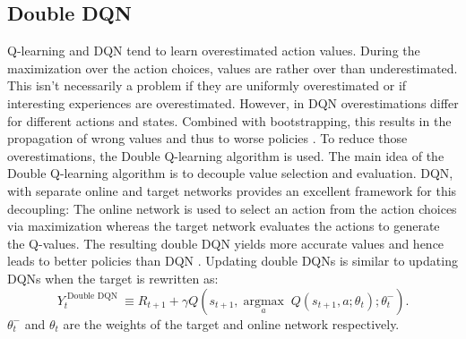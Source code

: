 \subsection{Double DQN}
Q-learning  and DQN tend to learn overestimated action values. During the maximization over the action choices, values are rather over than underestimated.
This isn't necessarily a problem if they are uniformly overestimated or if interesting experiences are overestimated. However, in DQN overestimations differ for different actions and states. Combined with bootstrapping, this results in the propagation of wrong values and thus to worse policies \cite{DBLP:journals/corr/HasseltGS15}. To reduce those overestimations, the Double Q-learning algorithm \cite{DBLP:journals/corr/HasseltGS15} is used. 
The main idea of the Double Q-learning algorithm is to decouple value selection and evaluation.
DQN, with separate online and target networks provides an excellent framework for this decoupling:
The online network is used to select an action from the action choices via maximization whereas the target network evaluates the actions to generate the Q-values.
The resulting double DQN yields more accurate values and hence leads to better policies than DQN \cite{DBLP:journals/corr/HasseltGS15}.
Updating double DQNs is similar to updating DQNs when the target is rewritten as:
\begin{equation}\label{eq:DDQN-target}
Y_{t}^{\text { Double DQN }} \equiv R_{t+1}+\gamma Q\left(s_{t+1}, \underset{a}{\operatorname{argmax}}\; Q\left(s_{t+1}, a ; \theta_{t}\right); \theta_{t}^{-}\right).
\end{equation}
$\theta_{t}^{-}$ and $\theta_{t}$ are the weights of the target and online network respectively.
